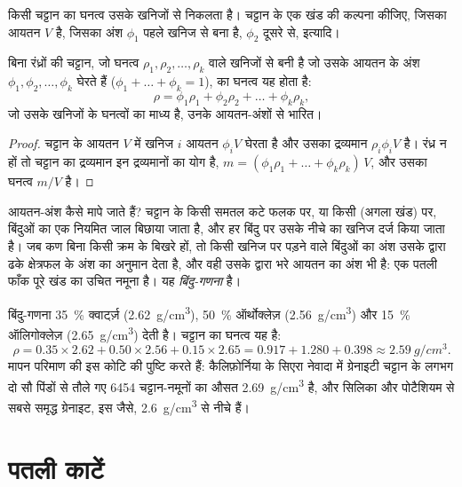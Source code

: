 किसी चट्टान का घनत्व उसके खनिजों से निकलता है। चट्टान के एक खंड की कल्पना कीजिए, जिसका
आयतन $V$ है, जिसका अंश $\phi_1$ पहले खनिज से बना है, $\phi_2$
दूसरे से, इत्यादि।

\begin{proposition}[खनिजों से चट्टान का घनत्व]\label{prop:g11:minerals:density}
बिना रंध्रों की चट्टान, जो घनत्व $\rho_1, \rho_2, \dots,
\rho_k$ वाले खनिजों से बनी है जो उसके आयतन के अंश $\phi_1, \phi_2, \dots, \phi_k$ घेरते हैं
($\phi_1 + \dots + \phi_k = 1$), का घनत्व यह होता है:
\[
  \rho = \phi_1 \rho_1 + \phi_2 \rho_2 + \dots + \phi_k \rho_k ,
\]
जो उसके खनिजों के घनत्वों का माध्य है, उनके आयतन-अंशों से
भारित।
\end{proposition}

\begin{proof}
चट्टान के आयतन $V$ में खनिज $i$ आयतन $\phi_i V$ घेरता है और उसका
द्रव्यमान $\rho_i \phi_i V$ है। रंध्र न हों तो चट्टान का द्रव्यमान इन
द्रव्यमानों का योग है, $m = (\phi_1 \rho_1 + \dots + \phi_k \rho_k)\,V$, और उसका
घनत्व $m/V$ है।
\end{proof}

आयतन-अंश कैसे मापे जाते हैं? चट्टान के किसी समतल कटे फलक पर, या किसी
 (अगला खंड) पर, बिंदुओं का एक नियमित जाल बिछाया जाता है, और
हर बिंदु पर उसके नीचे का खनिज दर्ज किया जाता है। जब कण बिना किसी क्रम
के बिखरे हों, तो किसी खनिज पर पड़ने वाले बिंदुओं का अंश
उसके द्वारा ढके क्षेत्रफल के अंश का अनुमान देता है, और वही उसके द्वारा भरे
आयतन का अंश भी है: एक पतली फाँक पूरे खंड का उचित नमूना है। यह
\emph{बिंदु-गणना} है।

\begin{example}[क्वार्ट्ज़ और पोटैशियम फ़ेल्डस्पार से समृद्ध एक हल्का ग्रेनाइट]
बिंदु-गणना \qty{35}{\percent} क्वार्ट्ज़ (\qty{2.62}{g/cm^3}),
\qty{50}{\percent} ऑर्थोक्लेज़ (\qty{2.56}{g/cm^3}) और \qty{15}{\percent}
ऑलिगोक्लेज़ (\qty{2.65}{g/cm^3}) देती है। चट्टान का घनत्व यह है:
\[
  \rho = 0.35 \times 2.62 + 0.50 \times 2.56 + 0.15 \times 2.65
       = 0.917 + 1.280 + 0.398 \approx \qty{2.59}{g/cm^3}.
\]
मापन परिमाण की इस कोटि की पुष्टि करते हैं: कैलिफ़ोर्निया के सिएरा नेवादा में
ग्रेनाइटी चट्टान के लगभग दो सौ पिंडों से तौले गए \num{6454} चट्टान-नमूनों का
औसत \qty{2.69}{g/cm^3} है, और सिलिका और पोटैशियम से सबसे समृद्ध ग्रेनाइट,
इस जैसे, \qty{2.6}{g/cm^3} से नीचे हैं।
\end{example}

\section{पतली काटें}

